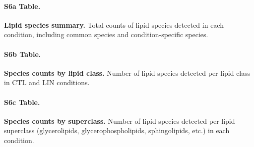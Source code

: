 \documentclass[9pt,twocolumn,twoside]{rilabRxiv}
\begin{document}
\paragraph*{S6a Table.}
\makeatletter
\def\@currentlabelname{S6a Table} 
\makeatother
\label{S6a_Table}                                                                                  
\textbf{Lipid species summary.} Total counts of lipid species detected in each condition, including common species and condition-specific species.                                                    
                                                                                                 
\paragraph*{S6b Table.}
\makeatletter
\def\@currentlabelname{S6b Table} 
\makeatother
\label{S6b_Table}                                                                                  
\textbf{Species counts by lipid class.} Number of lipid species detected per lipid class in CTL and LIN conditions.                                                                          
                                                                                                 
\paragraph*{S6c Table.}
\makeatletter
\def\@currentlabelname{S6c Table} 
\makeatother
\label{S6c_Table}                                                                                  
\textbf{Species counts by superclass.} Number of lipid species detected per lipid superclass (glycerolipids, glycerophospholipids, sphingolipids, etc.) in each condition.                      
                                                                                                                                                      
                                                                                                 
\end{document}

